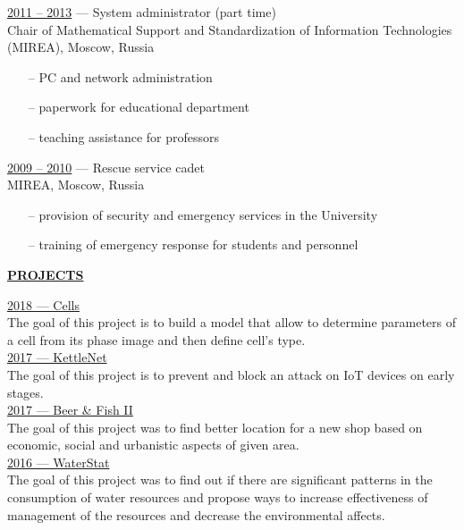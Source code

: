 \documentclass[a4paper,10pt,fullpage]{article}
\begin{document}
\underline{2011 -- 2013} --- System administrator (part time)\\
 Chair of Mathematical Support and Standardization of Information Technologies (MIREA), Moscow, Russia
\begin{itemize}
	\item[--] PC and network administration
	\item[--] paperwork for educational department
	\item[--] teaching assistance for professors\\
\end{itemize}

\underline{2009 -- 2010} --- Rescue service cadet\\
MIREA, Moscow, Russia
\begin{itemize}
	\item[--] provision of security and emergency services in the University
	\item[--] training of emergency response for students and personnel \\
\end{itemize}

\begin{center}
	\underline{\textbf{PROJECTS}}
\end{center}

\underline{2018 --- Cells}\\
The goal of this project is to build a model that allow to determine parameters of a cell from its phase image and then define cell's type.\\

\underline{2017 --- KettleNet}\\
The goal of this project is to prevent and block an attack on IoT devices on early stages.\\

\underline{2017 --- Beer \& Fish II}\\
The goal of this project was to find better location for a new shop based on economic, social and 
urbanistic aspects of given area.\\

\underline{2016 --- WaterStat}\\
The goal of this project was to find out if there are significant patterns in the consumption of water resources and propose ways to increase effectiveness of management of the resources and decrease the environmental affects.\\
\end{document}
